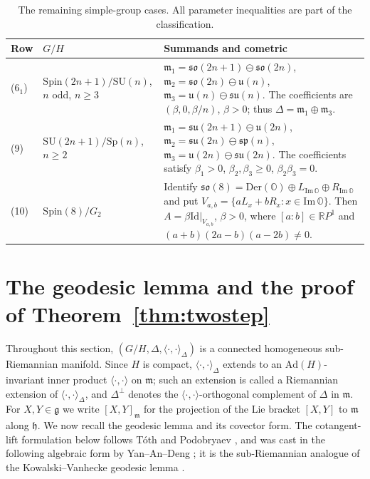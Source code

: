 \documentclass[12pt]{amsart}
\theoremstyle{plain}
\theoremstyle{definition}
\theoremstyle{remark}
\newcommand{\alg}[1]{\mathfrak{#1}}
\newcommand{\RR}{\mathbb{R}}
\newcommand{\OO}{\mathbb{O}}
\newcommand{\Idm}{\mathrm{Id}}
\begin{document}
\begin{table}[htbp]
\centering
\caption{The remaining simple-group cases. All parameter inequalities are part of the
classification.}
\label{tab:rem}
\begin{tabular}{@{}l l p{2.7in}@{}}
\toprule
Row & $G/H$ & Summands and cometric\\
\midrule
(6$_1$) & $\mathrm{Spin}(2n{+}1)/\mathrm{SU}(n)$, $n$ odd, $n\ge3$ &
$\alg{m}_1=\alg{so}(2n{+}1)\ominus\alg{so}(2n)$, $\alg{m}_2=\alg{so}(2n)\ominus\alg{u}(n)$,
$\alg{m}_3=\alg{u}(n)\ominus\alg{su}(n)$. The coefficients are $(\beta,0,\beta/n)$, $\beta>0$;
thus $\Delta=\alg{m}_1\oplus\alg{m}_3$.\\[4pt]
(9) & $\mathrm{SU}(2n{+}1)/\mathrm{Sp}(n)$, $n\ge2$ &
$\alg{m}_1=\alg{su}(2n{+}1)\ominus\alg{u}(2n)$, $\alg{m}_2=\alg{su}(2n)\ominus\alg{sp}(n)$,
$\alg{m}_3=\alg{u}(2n)\ominus\alg{su}(2n)$. The coefficients satisfy $\beta_1>0$,
$\beta_2,\beta_3\ge0$, $\beta_2\beta_3=0$.\\[4pt]
(10) & $\mathrm{Spin}(8)/G_2$ &
Identify $\alg{so}(8)=\mathrm{Der}(\OO)\oplus L_{\mathrm{Im}\,\OO}\oplus R_{\mathrm{Im}\,\OO}$ and
put $V_{a,b}=\{aL_x+bR_x:x\in\mathrm{Im}\,\OO\}$. Then $A=\beta\Idm|_{V_{a,b}}$, $\beta>0$, where
$[a:b]\in\RR P^1$ and $(a+b)(2a-b)(a-2b)\neq0$.\\
\bottomrule
\end{tabular}
\end{table}

\section{The geodesic lemma and the proof of Theorem~\ref{thm:twostep}}\label{sec:geod}

Throughout this section, $(G/H,\Delta,\langle\cdot,\cdot\rangle_\Delta)$ is a connected
homogeneous sub-Riemannian manifold. Since $H$ is compact, $\langle\cdot,\cdot\rangle_\Delta$
extends to an $\mathrm{Ad}(H)$-invariant inner product $\langle\cdot,\cdot\rangle$ on
$\alg{m}$; such an extension is called a Riemannian extension of
$\langle\cdot,\cdot\rangle_\Delta$, and $\Delta^{\perp}$ denotes the
$\langle\cdot,\cdot\rangle$-orthogonal complement of $\Delta$ in $\alg{m}$. For $X,Y\in\alg{g}$
we write $[X,Y]_{\alg{m}}$ for the projection of the Lie bracket $[X,Y]$ to $\alg{m}$ along
$\alg{h}$.
We now recall the  geodesic lemma and its covector form.
The cotangent-lift formulation below follows T\'oth \cite{Toth} and Podobryaev \cite{Podobryaev},
and was cast in the following algebraic form by Yan--An--Deng \cite{YAD}; it is the
sub-Riemannian analogue of the Kowalski--Vanhecke geodesic lemma \cite{KowalskiVanhecke}.
\end{document}
